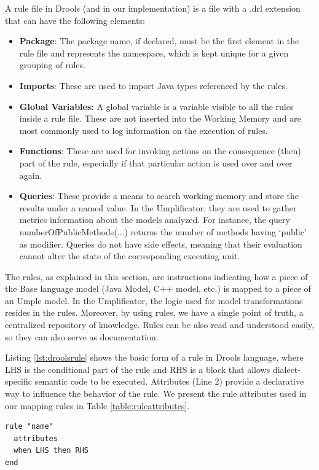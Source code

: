 A rule file in Drools (and in our implementation) is a file with a .drl extension that can have the following elements:

\begin{itemize}
\item \textbf{Package}: The package name, if declared, must be the first element in the rule file and represents the namespace, which is kept unique for a given grouping of rules.
\item \textbf{Imports}: These are used to import Java types referenced by the rules.
\item \textbf{Global Variables:} A global variable is a variable visible to all the rules inside a rule file. These are not inserted into the Working Memory and are most commonly used to log information on the execution of rules.
\item \textbf{Functions}: These are used for invoking actions on the consequence (then) part of the rule, especially if that particular action is used over and over again. 
\item \textbf{Queries}: These provide a means to search working memory and store the results under a named value. In the Umplificator, they are used to gather metrics information about the models analyzed. For instance, the query  numberOfPublicMethods(...) returns the number of methods having `public' as modifier. Queries do not have side effects, meaning that their evaluation cannot alter the state of the corresponding executing unit. 
\end{itemize}

The rules, as explained in this section, are instructions indicating how a piece of the Base language model (Java Model, C++ model, etc.) is mapped to a piece of an Umple model. In the Umplificator, the logic used for model transformations resides in the rules. Moreover, by using rules, we have a single point of truth, a centralized repository of knowledge. Rules can be also read and understood easily, so they can also serve as documentation.

Listing \ref{lst:droolsrule} shows the basic form of a rule in Drools language, where LHS is the conditional part of the rule and RHS is a block that allows dialect-specific semantic code to be executed.  Attributes (Line 2) provide a declarative way to influence the behavior of the rule. We present the rule attributes used in our mapping rules in Table \ref{table:ruleattributes}.

\begin{lstlisting}[language={drools},label={lst:droolsrule}, caption=Basic rule in Drools] 
rule "name" 
  attributes 
  when LHS then RHS
end
\end{lstlisting}

